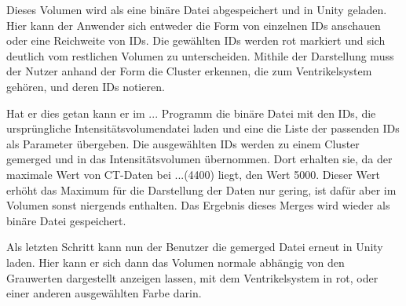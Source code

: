 Dieses Volumen wird als eine binäre Datei abgespeichert und in Unity geladen. Hier kann der Anwender sich entweder die Form von einzelnen IDs anschauen oder eine Reichweite von IDs. Die gewählten IDs werden rot markiert und sich deutlich vom restlichen Volumen zu unterscheiden. Mithile der Darstellung muss der Nutzer anhand der Form die Cluster erkennen, die zum Ventrikelsystem gehören, und deren IDs notieren. 

Hat er dies getan kann er im ... Programm die binäre Datei mit den IDs, die ursprüngliche Intensitätsvolumendatei laden und eine die Liste der passenden IDs als Parameter übergeben. Die ausgewählten IDs werden zu einem Cluster gemerged und in das Intensitätsvolumen übernommen. Dort erhalten sie, da der maximale Wert von CT-Daten bei ...(4400) liegt, den Wert 5000. Dieser Wert erhöht das Maximum für die Darstellung der Daten nur gering, ist dafür aber im Volumen sonst niergends enthalten. Das Ergebnis dieses Merges wird wieder als binäre Datei gespeichert.

Als letzten Schritt kann nun der Benutzer die gemerged Datei erneut in Unity laden. Hier kann er sich dann das Volumen normale abhängig von den Grauwerten dargestellt anzeigen lassen, mit dem Ventrikelsystem in rot, oder einer anderen ausgewählten Farbe darin.


